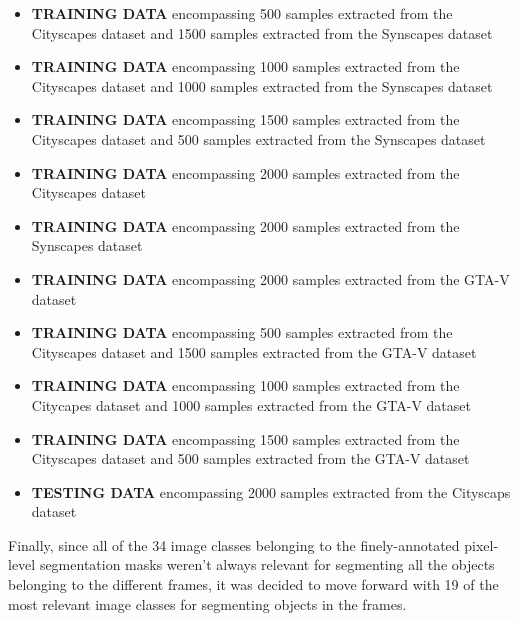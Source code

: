 \documentclass[conference]{IEEEtran}
\begin{document}
\begin{itemize}

\item \textbf{TRAINING DATA} encompassing 500 samples extracted from the Cityscapes dataset and 1500 samples extracted from the Synscapes dataset

\item \textbf{TRAINING DATA} encompassing 1000 samples extracted from the Cityscapes dataset and 1000 samples extracted from the Synscapes dataset

\item \textbf{TRAINING DATA} encompassing 1500 samples extracted from the Cityscapes dataset and 500 samples extracted from the Synscapes dataset 

\item \textbf{TRAINING DATA} encompassing 2000 samples extracted from the Cityscapes dataset

\item \textbf{TRAINING DATA} encompassing 2000 samples extracted from the Synscapes dataset

\item \textbf{TRAINING DATA} encompassing 2000 samples extracted from the GTA-V dataset

\item \textbf{TRAINING DATA} encompassing 500 samples extracted from the Cityscapes dataset and 1500 samples extracted from the GTA-V dataset

\item \textbf{TRAINING DATA} encompassing 1000 samples extracted from the Citycapes dataset and 1000 samples extracted from the GTA-V dataset

\item \textbf{TRAINING DATA} encompassing 1500 samples extracted from the Cityscapes dataset and 500 samples extracted from the GTA-V dataset

\item \textbf{TESTING DATA} encompassing 2000 samples extracted from the Cityscaps dataset

\end{itemize}

Finally, since all of the 34 image classes belonging to the finely-annotated pixel-level segmentation masks weren't always relevant for segmenting all the objects belonging to the different frames, it was decided to move forward with 19 of the most relevant image classes for segmenting objects in the frames.


\end{document}

